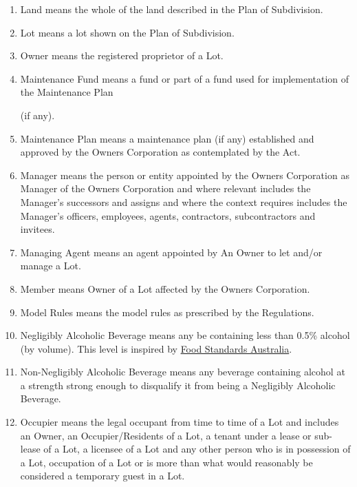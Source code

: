 \documentclass{article}
\begin{document}
\begin{enumerate}[label=\arabic*.]
\begin{enumerate}[label=\arabic{enumi}.\arabic*.]
\begin{enumerate}[label=(\arabic*)]
\item  Land means the whole of the land described in the Plan of Subdivision.

\item  Lot means a lot shown on the Plan of Subdivision.

\item  Owner means the registered proprietor of a Lot.

\item  Maintenance Fund means a fund or part of a fund used for implementation of the Maintenance Plan

(if any).

\item  Maintenance Plan means a maintenance plan (if any) established and approved by the Owners Corporation as contemplated by the Act.

\item  Manager means the person or entity appointed by the Owners Corporation as Manager of the Owners Corporation and where relevant includes the Manager’s successors and assigns and where the context requires includes the Manager’s officers, employees, agents, contractors, subcontractors and invitees.

\item  Managing Agent means an agent appointed by An Owner to let and/or manage a Lot.
\newpage



\item  Member means Owner of a Lot affected by the Owners Corporation.

\item  Model Rules means the model rules as prescribed by the Regulations.

\item Negligibly Alcoholic Beverage means any be containing less than 0.5\% alcohol (by volume). This level is inspired by \href{https://www.foodstandards.gov.au/consumer/labelling/Labelling-of-alcoholic-beverages}{Food Standards Australia}.
\item Non-Negligibly Alcoholic Beverage means any beverage containing alcohol at a strength strong enough to disqualify it from being a Negligibly Alcoholic Beverage.
\item  Occupier means the legal occupant from time to time of a Lot and includes an Owner, an Occupier/Residents of a Lot, a tenant under a lease or sub-lease of a Lot, a licensee of a Lot and any other person who is in possession of a Lot, occupation of a Lot or is more than what would reasonably be considered a temporary guest in a Lot.


\end{enumerate}
\end{enumerate}
\end{enumerate}
\end{document}

